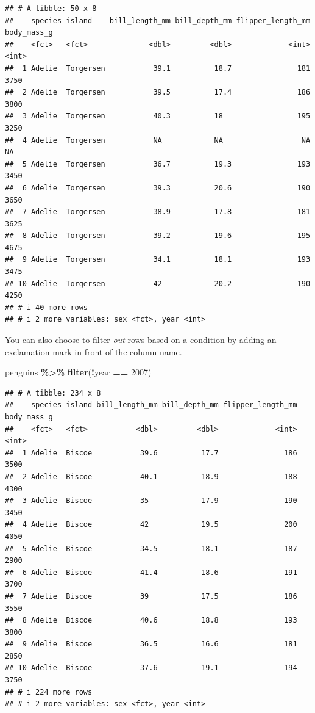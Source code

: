 \documentclass[
]{book}
\newenvironment{Shaded}{\begin{snugshade}}{\end{snugshade}}
\newcommand{\DecValTok}[1]{\textcolor[rgb]{0.00,0.00,0.81}{#1}}
\newcommand{\FunctionTok}[1]{\textcolor[rgb]{0.13,0.29,0.53}{\textbf{#1}}}
\newcommand{\NormalTok}[1]{#1}
\newcommand{\SpecialCharTok}[1]{\textcolor[rgb]{0.81,0.36,0.00}{\textbf{#1}}}
\begin{document}
\begin{verbatim}
## # A tibble: 50 x 8
##    species island    bill_length_mm bill_depth_mm flipper_length_mm body_mass_g
##    <fct>   <fct>              <dbl>         <dbl>             <int>       <int>
##  1 Adelie  Torgersen           39.1          18.7               181        3750
##  2 Adelie  Torgersen           39.5          17.4               186        3800
##  3 Adelie  Torgersen           40.3          18                 195        3250
##  4 Adelie  Torgersen           NA            NA                  NA          NA
##  5 Adelie  Torgersen           36.7          19.3               193        3450
##  6 Adelie  Torgersen           39.3          20.6               190        3650
##  7 Adelie  Torgersen           38.9          17.8               181        3625
##  8 Adelie  Torgersen           39.2          19.6               195        4675
##  9 Adelie  Torgersen           34.1          18.1               193        3475
## 10 Adelie  Torgersen           42            20.2               190        4250
## # i 40 more rows
## # i 2 more variables: sex <fct>, year <int>
\end{verbatim}

You can also choose to filter \emph{out} rows based on a condition by adding an exclamation mark in front of the column name.

\begin{Shaded}
\begin{Highlighting}[]
\NormalTok{penguins }\SpecialCharTok{\%\textgreater{}\%}
  \FunctionTok{filter}\NormalTok{(}\SpecialCharTok{!}\NormalTok{year }\SpecialCharTok{==} \DecValTok{2007}\NormalTok{)}
\end{Highlighting}
\end{Shaded}

\begin{verbatim}
## # A tibble: 234 x 8
##    species island bill_length_mm bill_depth_mm flipper_length_mm body_mass_g
##    <fct>   <fct>           <dbl>         <dbl>             <int>       <int>
##  1 Adelie  Biscoe           39.6          17.7               186        3500
##  2 Adelie  Biscoe           40.1          18.9               188        4300
##  3 Adelie  Biscoe           35            17.9               190        3450
##  4 Adelie  Biscoe           42            19.5               200        4050
##  5 Adelie  Biscoe           34.5          18.1               187        2900
##  6 Adelie  Biscoe           41.4          18.6               191        3700
##  7 Adelie  Biscoe           39            17.5               186        3550
##  8 Adelie  Biscoe           40.6          18.8               193        3800
##  9 Adelie  Biscoe           36.5          16.6               181        2850
## 10 Adelie  Biscoe           37.6          19.1               194        3750
## # i 224 more rows
## # i 2 more variables: sex <fct>, year <int>
\end{verbatim}
\end{document}
